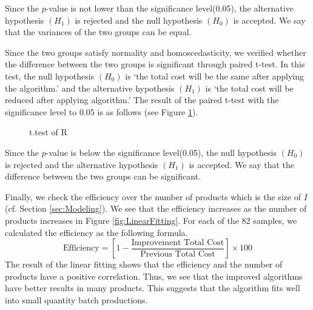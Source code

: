 \documentclass[a4paper]{amsart}
\numberwithin{equation}{section} %
\numberwithin{figure}{section} %
\numberwithin{table}{section}
\theoremstyle{plain}
\theoremstyle{definition}
\theoremstyle{plain}
\theoremstyle{plain}
\theoremstyle{plain}
\theoremstyle{plain}
\theoremstyle{plain}
\begin{document}
Since the $p$-value is not lower than the significance level(0.05), the alternative hypothesis $(H_{1})$ is rejected and the null hypothesis $(H_{0})$ is accepted. 
We say that the variances of the two groups can be equal.

Since the two groups satisfy normality and homoscedasticity, we verified whether the difference between the two groups is significant through paired t-test. In this test, the null hypothesis $(H_{0})$ is `the total cost will be the same after applying the algorithm.' and the alternative hypothesis $(H_{1})$ is `the total cost will be reduced after applying algorithm.' The result of the paired t-test with the significance level to 0.05 is as follows (see Figure \ref{fig:ttest}).

\begin{figure}[h!]
	\centering
	\caption{t.test of R}
	\label{fig:ttest}       %
\end{figure}

Since the $p$-value is below the significance level(0.05), the null hypothesis $(H_{0})$ is rejected and the alternative hypothesis $(H_{1})$ is accepted. We say that the difference between the two groups can be significant.

Finally, we check the efficiency over the number of products which is the size of $I$ (cf. Section \ref{sec:Modeling}).
We see that the efficiency increases as the number of products increases in Figure \ref{fig:LinearFitting}.
For each of the 82 samples, we calculated the efficiency as the following formula.
\begin{equation}
	\textrm{Efficiency} = \left[1-\frac{\textrm{Improvement~Total~Cost}}{\textrm{Previous~Total~Cost}}\right]\times 100
\end{equation}
The result of the linear fitting shows that the efficiency and the number of products have a positive correlation.
Thus, we see that the improved algorithms have better results in many products.
This suggests that the algorithm fits well into small quantity batch productions.
\end{document}
